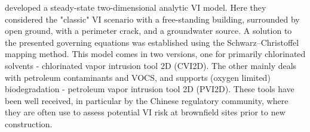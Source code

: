 \citeauthor{verginelli_excel-based_2016}\cite{verginelli_excel-based_2016} developed a steady-state two-dimensional analytic VI model.
Here they considered the "classic" VI scenario with a free-standing building, surrounded by open ground, with a perimeter crack, and a groundwater source.
A solution to the presented governing equations was established using the Schwarz–Christoffel mapping method.
This model comes in two versions, one for primarily chlorinated solvents - chlorinated vapor intrusion tool 2D (CVI2D).
The other mainly deals with petroleum contaminants and VOCS, and supports (oxygen limited) biodegradation - petroleum vapor intrusion tool 2D (PVI2D).
These tools have been well received, in particular by the Chinese regulatory community, where they are often use to assess potential VI risk at brownfield sites prior to new construction.\par
